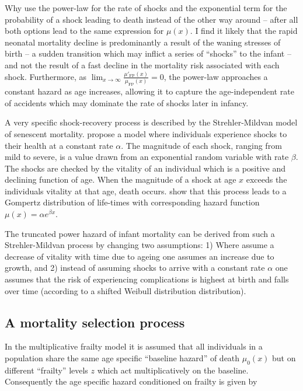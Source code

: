 \documentclass[smallextended]{svjour3} %
\begin{document}
Why use the power-law for the rate of shocks and the exponential term
for the probability of a shock leading to death instead of the other way
around -- after all both options lead to the same expression for
\(\mu(x)\). I find it likely that the rapid neonatal mortality decline
is predominantly a result of the waning stresses of birth -- a sudden
transition which may inflict a series of ``shocks'' to the infant -- and
not the result of a fast decline in the mortality risk associated with
each shock. Furthermore, as
\(\lim_{x\to\infty}\frac{\mu'_\text{FP}(x)}{\mu_\text{FP}(x)}=0\), the
power-law approaches a constant hazard as age increases, allowing it to
capture the age-independent rate of accidents which may dominate the
rate of shocks later in infancy.

A very specific shock-recovery process is described by the
Strehler-Mildvan model of senescent mortality. \citet{Strehler1960}
propose a model where individuals experience shocks to their health at a
constant rate \(\alpha\). The magnitude of each shock, ranging from mild
to severe, is a value drawn from an exponential random variable with
rate \(\beta\). The shocks are checked by the vitality of an individual
which is a positive and declining function of age. When the magnitude of
a shock at age \(x\) exceeds the individuals vitality at that age, death
occurs. \citet{Strehler1960} show that this process leads to a Gompertz
distribution of life-times with corresponding hazard function
\(\mu(x)=\alpha e^{\beta x}\).

The truncated power hazard of infant mortality can be derived from such
a Strehler-Mildvan process by changing two assumptions: 1) Where
\citet{Strehler1960} assume a decrease of vitality with time due to
ageing one assumes an increase due to growth, and 2) instead of assuming
shocks to arrive with a constant rate \(\alpha\) one assumes that the
risk of experiencing complications is highest at birth and falls over
time (according to a shifted Weibull distribution distribution).

\subsection*{A mortality selection
process}\label{a-mortality-selection-process}

In the multiplicative frailty model \citep{Vaupel1979} it is assumed
that all individuals in a population share the same age specific
``baseline hazard'' of death \(\mu_0(x)\) but on different ``frailty''
levels \(z\) which act multiplicatively on the baseline. Consequently
the age specific hazard conditioned on frailty is given by
\end{document}
